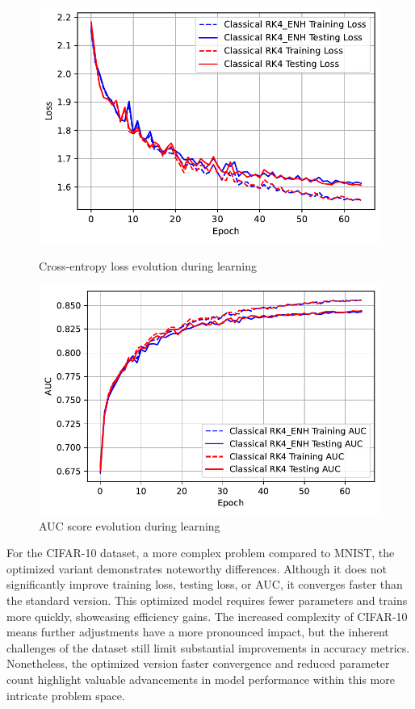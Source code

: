 \documentclass[12pt,a4paper]{report}
\begin{document}
\begin{figure}[th]
  \centering
  \includegraphics[scale=0.88]{./pics/new_pdf_graphs/classical/3_enc_1_rk_1_dec/classical_transfomer_loss_cifar10_rk4_rk4_enh.pdf}
  \caption[Cross-entropy loss evolution during learning]{Cross-entropy loss evolution during learning}
  \label{fig:p33}
  \vspace*{\floatsep}
  \centering
  \includegraphics[scale=0.88]{./pics/new_pdf_graphs/classical/3_enc_1_rk_1_dec/classical_transfomer_auc_cifar10_rk4_rk4_enh.pdf}
  \caption[AUC score evolution during learning]{AUC score evolution during learning}
  \label{fig:p34}
\end{figure}

For the CIFAR-10 dataset, a more complex problem compared to MNIST, the optimized variant demonstrates noteworthy differences. Although it does not significantly improve training loss, testing loss, or AUC, it converges faster than the standard version. This optimized model requires fewer parameters and trains more quickly, showcasing efficiency gains. The increased complexity of CIFAR-10 means further adjustments have a more pronounced impact, but the inherent challenges of the dataset still limit substantial improvements in accuracy metrics. Nonetheless, the optimized version faster convergence and reduced parameter count highlight valuable advancements in model performance within this more intricate problem space.
\end{document}
